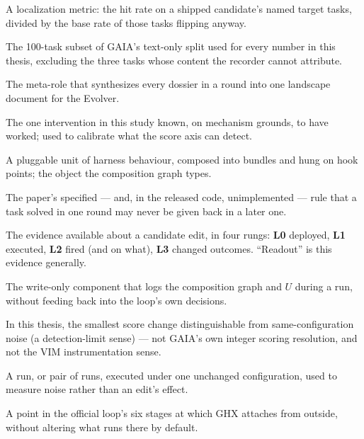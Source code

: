 \begin{description}[leftmargin=1.8em,labelsep=0.4em,itemsep=0.5pt,parsep=0pt,topsep=2pt]
\item[lift] A localization metric: the hit rate on a shipped candidate's
named target tasks, divided by the base rate of those tasks flipping
anyway.

\item[no-pixel bed] The 100-task subset of GAIA's text-only split used for
every number in this thesis, excluding the three tasks whose content the
recorder cannot attribute.

\item[Planner] The meta-role that synthesizes every dossier in a round
into one landscape document for the Evolver.

\item[positive control] The one intervention in this study known, on
mechanism grounds, to have worked; used to calibrate what the score axis
can detect.

\item[processor] A pluggable unit of harness behaviour, composed into
bundles and hung on hook points; the object the composition graph types.

\item[ratchet] The paper's specified --- and, in the released code,
unimplemented --- rule that a task solved in one round may never be given
back in a later one.

\item[readout / readout ladder (L0--L3)] The evidence available about a
candidate edit, in four rungs: \textbf{L0} deployed, \textbf{L1} executed,
\textbf{L2} fired (and on what), \textbf{L3} changed outcomes.
``Readout'' is this evidence generally.

\item[recorder] The write-only component that logs the composition graph
and $U$ during a run, without feeding back into the loop's own decisions.

\item[resolution] In this thesis, the smallest score change
distinguishable from same-configuration noise (a detection-limit sense) ---
not GAIA's own integer scoring resolution, and not the VIM instrumentation
sense.

\item[same-configuration window] A run, or pair of runs, executed under
one unchanged configuration, used to measure noise rather than an edit's
effect.

\item[seam] A point in the official loop's six stages at which GHX
attaches from outside, without altering what runs there by default.


\end{description}
